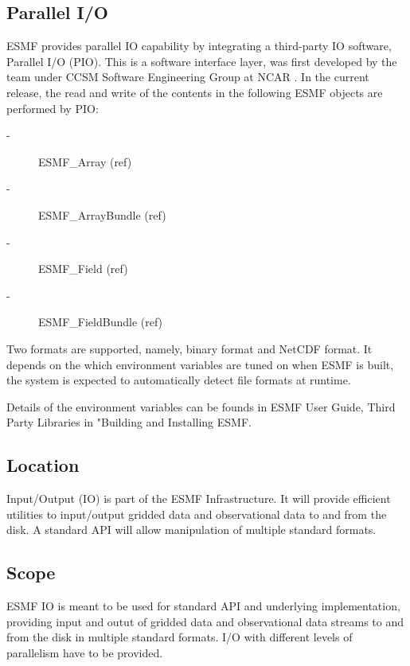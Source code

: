 

\subsection{Parallel I/O}

ESMF provides parallel IO capability by integrating a third-party IO
software, Parallel I/O (PIO). This is a software interface layer, was 
first developed by the team under CCSM Software Engineering Group at NCAR
\cite{CESM_Site}. In the current release, the read and write of the 
contents in the following ESMF objects are performed by PIO:

\begin{description}
\item[-] ESMF_Array (ref)
\item[-] ESMF_ArrayBundle (ref)
\item[-] ESMF_Field (ref)
\item[-] ESMF_FieldBundle (ref)
\end{description}

Two formats are supported, namely, binary format and NetCDF format.  
It depends on the which environment variables are tuned on when ESMF is built,
the system is expected to automatically detect file formats at runtime.

Details of the environment variables can be founds in ESMF User Guide, 
Third Party Libraries in "Building and Installing ESMF.



\subsection{Location}

Input/Output (IO) is part of the ESMF Infrastructure.  It will provide
efficient utilities to input/output gridded data and observational data
to and from the disk. A standard API will allow manipulation of multiple
standard formats.


\subsection{Scope}

ESMF IO is meant to be used for standard API and underlying implementation, 
providing input and outut of gridded data and observational data streams to 
and from the disk in multiple standard formats. I/O with different levels of 
parallelism have to be provided.  




